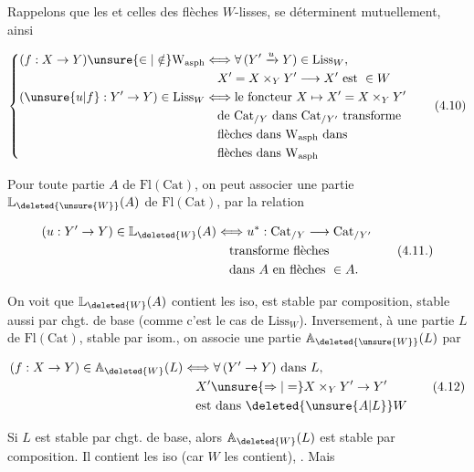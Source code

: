 
Rappelons que les    et celles  des flèches $W$-lisses, se déterminent mutuellement, ainsi

\[
\left\{\begin{aligned}
(f:X\to Y)\unsure{\in|\notin}\mathrm W_{\mathrm{asph}}&\Longleftrightarrow
  \forall\,(Y'\xrightarrow{u}Y)\in\mathrm{Liss}_{W},\\
  &\quad X'=X\times_Y Y'\longrightarrow X'\ \text{est}\ \in W\\
(\unsure{u|f}:Y'\to Y)\in\mathrm{Liss}_{W}&\Longleftrightarrow
  \text{le foncteur }X\mapsto X'=X\times_Y Y'\\
 &\quad\text{de }\mathrm{Cat}_{/Y}\text{ dans }\mathrm{Cat}_{/Y'}\ \text{transforme}\\
 &\quad\text{flèches dans }\mathrm W_{\mathrm{asph}}\text{ dans}\\
 &\quad\text{flèches dans }\mathrm W_{\mathrm{asph}}
\end{aligned}\right.
\tag*{(4.10)}
\]

Pour toute partie $A$ de $\mathrm{Fl}(\mathrm{Cat})$,  on peut associer une partie $\mathbb{L}_{\deleted{\unsure{W}}}(A)$ de $\mathrm{Fl}(\mathrm{Cat})$, par la relation

\[
\begin{aligned}
(u:Y'\to Y)\in\mathbb{L}_{\deleted{W}}(A)&\Longleftrightarrow u^*:\mathrm{Cat}_{/Y}\longrightarrow\mathrm{Cat}_{/Y'}\\
&\quad\text{transforme flèches}\\
&\quad\text{dans }A\text{ en flèches }\in A.
\end{aligned}
\tag*{(4.11.)}
\]

On voit que $\mathbb{L}_{\deleted{W}}(A)$ contient les iso, est stable par composition,    stable aussi par chgt. de base (comme c'est le cas de $\mathrm{Liss}_{W}$).  Inversement, à une partie $L$ de $\mathrm{Fl}(\mathrm{Cat})$, stable par isom., on associe une partie $\mathbb A_{\deleted{\unsure{W}}}(L)$ par

\[
\begin{aligned}
(f:X\to Y)\in\mathbb A_{\deleted{W}}(L)&\Longleftrightarrow\forall\,(Y'\to Y)\text{ dans }L,\\
&\quad X'\unsure{\Rightarrow|=}X\times_Y Y'\to Y'\\
&\quad\text{est dans }\deleted{\unsure{A|L}}W
\end{aligned}
\tag*{(4.12)}
\]

Si $L$ est stable par chgt. de base, alors $\mathbb A_{\deleted{W}}(L)$ est stable par composition. Il contient les iso  (car $W$ les contient),   . Mais
